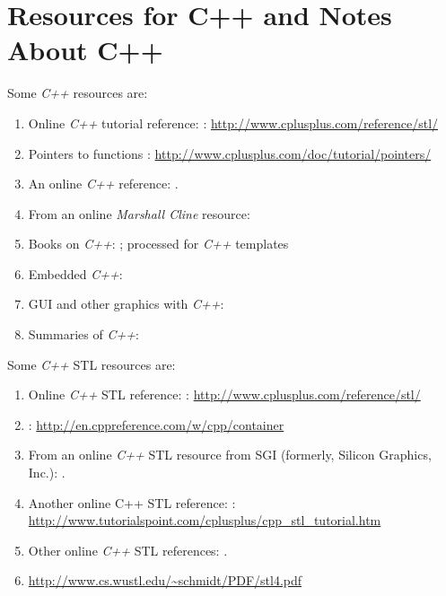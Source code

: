 \section{Resources for C++ and Notes About C++}
\label{sec:ResourcesAndNotesAboutCpp}



Some {\it C++} resources are: \vspace{-0.3cm}
\begin{enumerate} \itemsep -4pt
\item Online {\it C++} tutorial reference: \cite{CplusplusCom2015a,CplusplusCom2015b,CplusplusCom2014,Soulie2007}: \url{http://www.cplusplus.com/reference/stl/}
\item Pointers to functions \cite{CplusplusCom2015b}: \url{http://www.cplusplus.com/doc/tutorial/pointers/}
\item An online {\it C++} reference: \cite{cppreference2015}.
\item From an online {\it Marshall Cline} resource: \cite{Cline2011,Cline2003,Cline2000}
\item Books on {\it C++}: \cite{Pozrikidis2007,Koenig2000}; processed for {\it C++} templates
\item Embedded {\it C++}: \cite{Katupitiya2006}
\item GUI and other graphics with {\it C++}: \cite{Pozrikidis2007}
\item Summaries of {\it C++}: \cite{Josuttis1999} 
\end{enumerate}


Some {\it C++} STL resources are: \vspace{-0.3cm}
\begin{enumerate} \itemsep -4pt
\item Online {\it C++} STL reference: \cite{CplusplusCom2015}: \url{http://www.cplusplus.com/reference/stl/}
\item \cite{cppreference2015}: \url{http://en.cppreference.com/w/cpp/container}
\item From an online {\it C++} STL resource from SGI (formerly, Silicon Graphics, Inc.): \cite{HewlettPackardCompanyStaff2014,HewlettPackardCompanyStaff1994}.
\item Another online {C++} STL reference: \cite{Mohtashim2015a}: \url{http://www.tutorialspoint.com/cplusplus/cpp_stl_tutorial.htm}
\item Other online {\it C++} STL references: \cite{Riesbeck2009,Riesbeck2009a}.
\item \url{http://www.cs.wustl.edu/~schmidt/PDF/stl4.pdf}
\end{enumerate}

